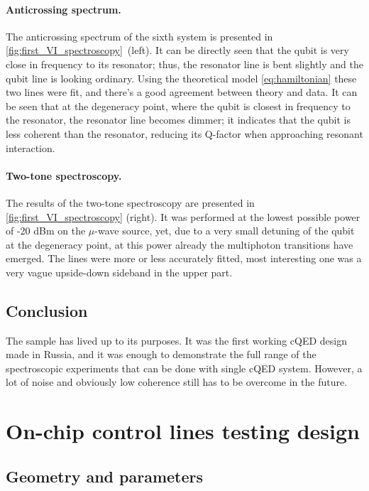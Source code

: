 \documentclass[12pt, twoside]{report}
\numberwithin{equation}{section}
\begin{document}
\paragraph{Anticrossing spectrum.} The anticrossing spectrum of the sixth system is presented in \autoref{fig:first_VI_spectroscopy}~(left). It can be directly seen that the qubit is very close in frequency to its resonator; thus, the resonator line is bent slightly and the qubit line is looking ordinary. Using the theoretical model \eqref{eq:hamiltonian} these two lines were fit, and there's a good agreement between theory and data. It can be seen that at the degeneracy point, where the qubit is closest in frequency to the resonator, the resonator line becomes dimmer; it indicates that the qubit is less coherent than the resonator, reducing its Q-factor when approaching resonant interaction. 



\paragraph{Two-tone spectroscopy.} The results of the two-tone spectroscopy are presented in \autoref{fig:first_VI_spectroscopy} (right). It was performed at the lowest possible power of -20 dBm on the $\mu$-wave source, yet, due to a very small detuning of the qubit at the degeneracy point, at this power already the multiphoton transitions have emerged. The lines were more or less accurately fitted, most interesting one was a very vague upside-down sideband in the upper part.

\subsection{Conclusion} 

The sample has lived up to its purposes. It was the first working cQED design made in Russia, and it was enough to demonstrate the full range of the spectroscopic experiments that can be done with single cQED system. However, a lot of noise and obviously low coherence still has to be overcome in the future.

\newpage

\section{On-chip control lines testing design}

\subsection{Geometry and parameters}
\end{document}
